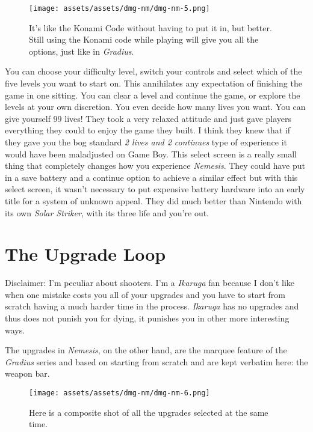 \documentclass{book}
\begin{document}
\begin{figure}[hbt]
\vskip 10pt
\centering \texttt{[image: assets/assets/dmg-nm/dmg-nm-5.png]}\par\pagetwodescription It’s like the Konami Code without having to put it in, but better. Still using the Konami code while playing will give you all the options, just like in \emph{Gradius}.
\vskip 6pt
\end{figure}

You can choose your difficulty level, switch your controls and select which of the five levels you want to start on. This annihilates any expectation of finishing the game in one sitting. You can clear a level and continue the game, or explore the levels at your own discretion. You even decide how many lives you want. You can give yourself 99 lives! They took a very relaxed attitude and just gave players everything they could to enjoy the game they built. I think they knew that if they gave you the bog standard \emph{2 lives and 2 continues} type of experience it would have been maladjusted on Game Boy. This select screen is a really small thing that completely changes how you experience \emph{Nemesis}. They could have put in a save battery and a continue option to achieve a similar effect but with this select screen, it wasn’t necessary to put expensive battery hardware into an early title for a system of unknown appeal. They did much better than Nintendo with its own \emph{Solar Striker}, with its three life and you’re out.

\FloatBarrier\needspace{10mm}\section*{The Upgrade Loop}\nopagebreak[4]

Disclaimer: I’m peculiar about shooters. I’m a \emph{Ikaruga} fan because I don’t like when one mistake costs you all of your upgrades and you have to start from scratch having a much harder time in the process. \emph{Ikaruga} has no upgrades and thus does not punish you for dying, it punishes you in other more interesting ways.

The upgrades in \emph{Nemesis}, on the other hand, are the marquee feature of the \emph{Gradius} series and based on starting from scratch and are kept verbatim here: the weapon bar.

\begin{figure}[hbt]
\vskip 10pt
\centering \texttt{[image: assets/assets/dmg-nm/dmg-nm-6.png]}\par\pagetwodescription Here is a composite shot of all the upgrades selected at the same time.
\vskip 6pt
\end{figure}
\end{document}
